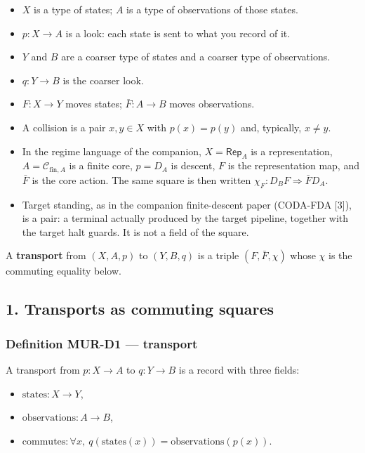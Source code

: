 \documentclass[
  11pt,
]{article}
\providecommand{\tightlist}{%
  \setlength{\itemsep}{0pt}\setlength{\parskip}{0pt}}
\begin{document}
\begin{itemize}
\tightlist
\item
  \(X\) is a type of states; \(A\) is a type of observations of those states.
\item
  \(p:X\to A\) is a look: each state is sent to what you record of it.
\item
  \(Y\) and \(B\) are a coarser type of states and a coarser type of observations.
\item
  \(q:Y\to B\) is the coarser look.
\item
  \(F:X\to Y\) moves states; \(\bar F:A\to B\) moves observations.
\item
  A collision is a pair \(x,y\in X\) with \(p(x)=p(y)\) and, typically, \(x\neq y\).
\item
  In the regime language of the companion, \(X=\mathsf{Rep}_A\) is a representation, \(A=\mathcal C_{\mathrm{fin},A}\) is a finite core, \(p=D_A\) is descent, \(F\) is the representation map, and \(\bar F\) is the core action. The same square is then written \(\chi_F:D_B F\Rightarrow
  \bar F D_A\).
\item
  Target standing, as in the companion finite-descent paper (CODA-FDA {[}3{]}), is a pair: a terminal actually produced by the target pipeline, together with the target halt guards. It is not a field of the square.
\end{itemize}

A \textbf{transport} from \((X,A,p)\) to \((Y,B,q)\) is a triple \((F,\bar F,\chi)\) whose \(\chi\) is the commuting equality below.

\subsection{1. Transports as commuting squares}\label{transports-as-commuting-squares}

\subsubsection{Definition MUR-D1 --- transport}\label{definition-mur-d1-transport}

A transport from \(p:X\to A\) to \(q:Y\to B\) is a record with three fields:

\begin{itemize}
\tightlist
\item
  \(\mathrm{states}:X\to Y\),
\item
  \(\mathrm{observations}:A\to B\),
\item
  \(\mathrm{commutes}:\forall x,\ q(\mathrm{states}(x))=\mathrm{observations}(p(x))\).
\end{itemize}
\end{document}
